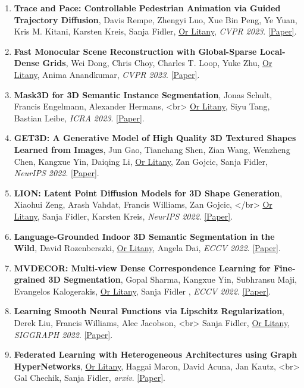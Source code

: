 \begin{enumerate}[leftmargin=*]
    \item \textbf{Trace and Pace: Controllable Pedestrian Animation via Guided Trajectory Diffusion}, Davis Rempe, Zhengyi Luo, Xue Bin Peng, Ye Yuan, Kris M. Kitani, Karsten Kreis, Sanja Fidler, \underline{Or Litany}, \textit{CVPR 2023}. \href{https://nv-tlabs.github.io/trace-pace/docs/trace_and_pace.pdf}{[Paper]}.
    \item \textbf{Fast Monocular Scene Reconstruction with Global-Sparse Local-Dense Grids}, Wei Dong, Chris Choy, Charles T. Loop, Yuke Zhu, \underline{Or Litany}, Anima Anandkumar, \textit{CVPR 2023}. \href{https://arxiv.org/abs/2305.13220}{[Paper]}.
    \item \textbf{Mask3D for 3D Semantic Instance Segmentation}, Jonas Schult, Francis Engelmann, Alexander Hermans, <br> \underline{Or Litany}, Siyu Tang, Bastian Leibe, \textit{ICRA 2023}. \href{https://arxiv.org/abs/2210.03105}{[Paper]}.
    \item \textbf{GET3D: A Generative Model of High Quality 3D Textured Shapes Learned from Images}, Jun Gao, Tianchang Shen, Zian Wang, Wenzheng Chen, Kangxue Yin, Daiqing Li, \underline{Or Litany}, Zan Gojcic, Sanja Fidler, \textit{NeurIPS 2022}. \href{https://arxiv.org/abs/2209.11163}{[Paper]}.
    \item \textbf{LION: Latent Point Diffusion Models for 3D Shape Generation}, Xiaohui Zeng, Arash Vahdat, Francis Williams, Zan Gojcic, </br> \underline{Or Litany}, Sanja Fidler, Karsten Kreis, \textit{NeurIPS 2022}. \href{https://arxiv.org/abs/2210.06978}{[Paper]}.
    \item \textbf{Language-Grounded Indoor 3D Semantic Segmentation in the Wild}, David Rozenberszki, \underline{Or Litany}, Angela Dai, \textit{ECCV 2022}. \href{https://arxiv.org/abs/2204.07761}{[Paper]}.
    \item \textbf{MVDECOR: Multi-view Dense Correspondence Learning for Fine-grained 3D Segmentation}, Gopal Sharma, Kangxue Yin, Subhransu Maji, Evangelos Kalogerakis, \underline{Or Litany}, Sanja Fidler , \textit{ECCV 2022}. \href{https://arxiv.org/abs/2208.08580}{[Paper]}.
    \item \textbf{Learning Smooth Neural Functions via Lipschitz Regularization}, Derek Liu, Francis Williams, Alec Jacobson, <br> Sanja Fidler, \underline{Or Litany}, \textit{SIGGRAPH 2022}. \href{https://arxiv.org/abs/2202.08345}{[Paper]}.
    \item \textbf{Federated Learning with Heterogeneous Architectures using Graph HyperNetworks}, \underline{Or Litany}, Haggai Maron, David Acuna, Jan Kautz, <br> Gal Chechik, Sanja Fidler, \textit{arxiv}. \href{https://arxiv.org/abs/2201.08459}{[Paper]}.

\end{enumerate}
